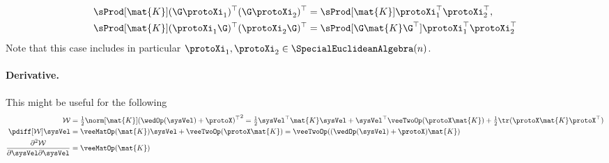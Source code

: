 \begin{subequations}\label{eq:InnerProductSE3Translation}
\begin{align}
 \label{eq:InnerProductSE3LeftTranslation}
 \sProd[\mat{K}]{(\G \protoXi_1)^\top}{(\G \protoXi_2)^\top}
 &= \sProd[\mat{K}]{\protoXi_1^\top}{\protoXi_2^\top},
\\
 \label{eq:InnerProductSE3RightTranslation}
 \sProd[\mat{K}]{(\protoXi_1 \G)^\top}{(\protoXi_2 \G)^\top} 
 &= \sProd[\G \mat{K} \G^\top]{\protoXi_1^\top}{\protoXi_2^\top}
\end{align} 
\end{subequations}
Note that this case includes in particular $\protoXi_1, \protoXi_2 \in \SpecialEuclideanAlgebra(n)$.

\paragraph{Derivative.} This might be useful for the following
\begin{align}
 \mathcal{W} &= \tfrac{1}{2} \norm[\mat{K}]{(\wedOp(\sysVel) + \protoX)^\top}^2 = \tfrac{1}{2}\sysVel^\top \mat{K} \sysVel + \sysVel^\top \veeTwoOp(\protoX\mat{K}) + \tfrac{1}{2} \tr(\protoX \mat{K} \protoX^\top)
\\
 \pdiff[\mathcal{W}]{\sysVel} &= \veeMatOp(\mat{K}) \sysVel + \veeTwoOp(\protoX\mat{K}) = \veeTwoOp((\wedOp(\sysVel) + \protoX)\mat{K})
\\
 \frac{\partial^2\mathcal{W}}{\partial\sysVel \partial\sysVel} &= \veeMatOp(\mat{K})
\end{align}



